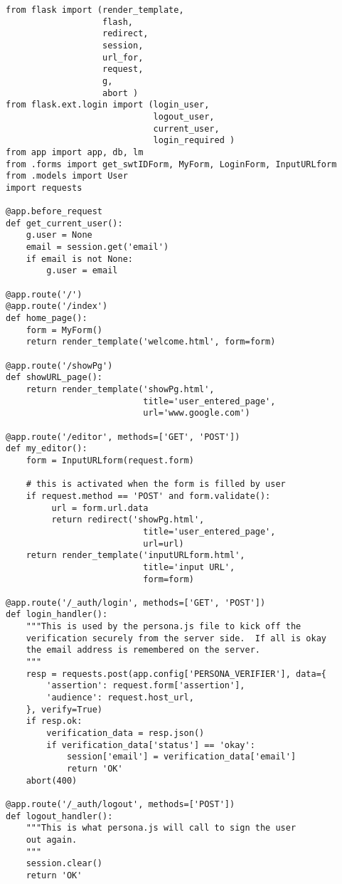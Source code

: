 \documentclass[11pt]{article}
\begin{document}
\begin{verbatim}
from flask import (render_template, 
                   flash, 
                   redirect,
                   session, 
                   url_for, 
                   request, 
                   g,
                   abort )
from flask.ext.login import (login_user, 
                             logout_user, 
                             current_user,
                             login_required )
from app import app, db, lm
from .forms import get_swtIDForm, MyForm, LoginForm, InputURLform
from .models import User
import requests

@app.before_request
def get_current_user():
    g.user = None
    email = session.get('email')
    if email is not None:
        g.user = email

@app.route('/')
@app.route('/index')
def home_page():
    form = MyForm()
    return render_template('welcome.html', form=form)

@app.route('/showPg')
def showURL_page():
    return render_template('showPg.html', 
                           title='user_entered_page', 
                           url='www.google.com')

@app.route('/editor', methods=['GET', 'POST'])
def my_editor():
    form = InputURLform(request.form) 

    # this is activated when the form is filled by user
    if request.method == 'POST' and form.validate():
         url = form.url.data
         return redirect('showPg.html', 
                           title='user_entered_page', 
                           url=url)
    return render_template('inputURLform.html',
                           title='input URL',
                           form=form)

@app.route('/_auth/login', methods=['GET', 'POST'])
def login_handler():
    """This is used by the persona.js file to kick off the
    verification securely from the server side.  If all is okay
    the email address is remembered on the server.
    """
    resp = requests.post(app.config['PERSONA_VERIFIER'], data={
        'assertion': request.form['assertion'],
        'audience': request.host_url,
    }, verify=True)
    if resp.ok:
        verification_data = resp.json()
        if verification_data['status'] == 'okay':
            session['email'] = verification_data['email']
            return 'OK'
    abort(400)

@app.route('/_auth/logout', methods=['POST'])
def logout_handler():
    """This is what persona.js will call to sign the user
    out again.
    """
    session.clear()
    return 'OK'


\end{verbatim}
\end{document}
